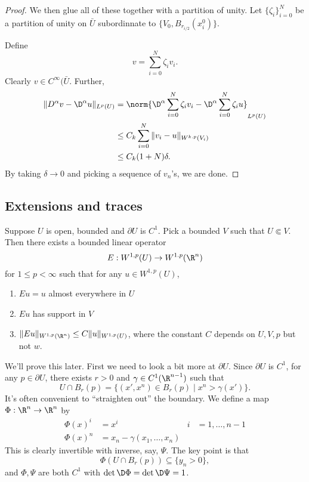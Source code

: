 \documentclass[a4paper]{article}
\begin{document}
\begin{proof}
  We then glue all of these together with a partition of unity. Let $\{\zeta_i\}_{i = 0}^N$ be a partition of unity on $\bar{U}$ subordinnate to $\{V_0, B_{r_{i/2}}(x_i^0)\}$.

  Define
  \[
    v = \sum_{i = 0}^N \zeta_i v_i.
  \]
  Clearly $v \in C^\infty(\bar{U}$. Further,
  \begin{align*}
    \|D^\alpha v - \D^\alpha u\|_{L^p(U)} &= \norm{\D^\alpha \sum_{i = 0}^N \zeta_i v_i - \D^\alpha \sum_{i = 0}^N \zeta_i u}_{L^p(U)}\\
    &\leq C_k \sum_{i = 0}^N \|v_i - u\|_{W^{k. p}(V_i)}\\
    &\leq C_k(1 + N)\delta.
  \end{align*}
  By taking $\delta \to 0$ and picking a sequence of $v_n$'s, we are done.
\end{proof}

\subsection{Extensions and traces}
\begin{thm}
  Suppose $U$ is open, bounded and $\partial U$ is $C^1$. Pick a bounded $V$ such that $U \Subset V$. Then there exists a bounded linear operator
  \[
    E: W^{1, p}(U) \to W^{1. p}(\R^n)
  \]
  for $1 \leq p < \infty$ such that for any $u \in W^{1, p}(U)$,
  \begin{enumerate}
    \item $Eu = u$ almost everywhere in $U$
    \item $Eu$ has support in $V$
    \item $\|Eu\|_{W^{1, p}(\R^n)} \leq C \|u\|_{W^{1, p}(U)}$, where the constant $C$ depends on $U, V, p$ but not $w$.
  \end{enumerate}
\end{thm}
We'll prove this later. First we need to look a bit more at $\partial U$. Since $\partial U$ is $C^1$, for any $p \in \partial U$, there exists $r > 0$ and $\gamma \in C^1(\R^{n - 1})$ such that
\[
  U \cap B_r(p) = \{(x', x^n) \in B_r(p) \mid x^n > \gamma(x')\}.
\]
It's often convenient to ``straighten out'' the boundary. We define a map $\Phi: \R^n \to \R^n$ by
\begin{align*}
  \Phi(x)^i &= x^i & i &= 1, \ldots, n -1\\
  \Phi(x)^n &= x_n - \gamma(x_1, \ldots, x_n)
\end{align*}
This is clearly invertible with inverse, say, $\Psi$. The key point is that
\[
  \Phi(U \cap B_r(p)) \subseteq \{y_n > 0\},
\]
and $\Phi, \Psi$ are both $C^1$ with $\det \D \Phi = \det \D \Psi = 1$.
\end{document}

